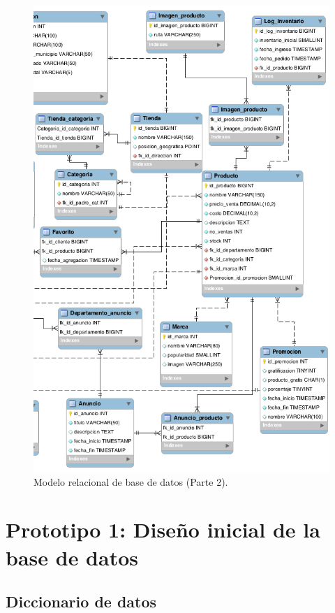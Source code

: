 \FloatBarrier
\begin{figure}[htbp!]
		\centering
			\includegraphics[width=.75 \textwidth]{imagenes/modeloDatos/modelorelacional_2}
		\caption{Modelo relacional de base de datos (Parte 2).}
		\label{image:modelorelacional-parte2}
\end{figure}
\FloatBarrier
 
\section{Prototipo 1: Diseño inicial de la base de datos}
\subsection{Diccionario de datos}

